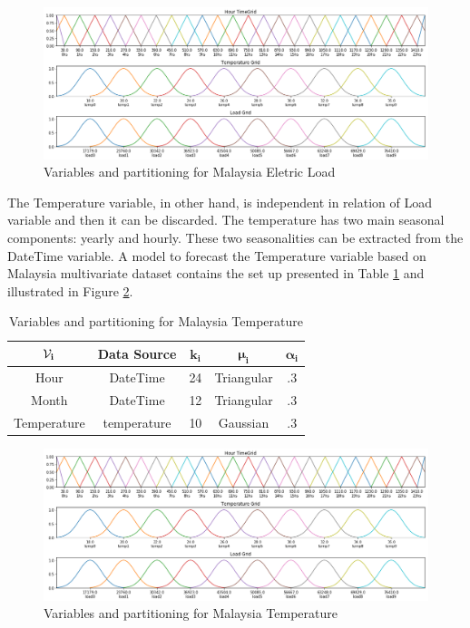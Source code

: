\begin{figure}[htb]
    \centering
    \includegraphics[width=\textwidth]{figures/variables_malaysia.png}
    \caption{Variables and partitioning for Malaysia Eletric Load}
    \label{fig:variables_malaysia_load}
\end{figure}

The Temperature variable, in other hand, is independent in relation of Load variable and then it can be discarded. The temperature has two main seasonal components: yearly and hourly. These two seasonalities can be extracted from the DateTime variable.  A model to forecast the Temperature variable based on Malaysia multivariate dataset contains the set up presented in Table \ref{tab:variables_malaysia_temperature} and illustrated in Figure \ref{fig:variables_malaysia_temperature}.

\begin{table}[htb]
    \centering
    \begin{tabular}{|c|c|c|c|c|} \hline
        $\mathbf{\mathcal{V}_i}$ & \textbf{Data Source} & $\mathbf{k_i}$ & $\mathbf{\mu_i}$ & $\mathbf{\alpha_i}$  \\ \hline
        Hour & DateTime & 24 & Triangular & .3 \\ \hline 
        Month & DateTime & 12 & Triangular & .3 \\ \hline 
        Temperature & temperature & 10 & Gaussian & .3 \\ \hline 
    \end{tabular}
    \caption{Variables and partitioning for Malaysia Temperature}
    \label{tab:variables_malaysia_temperature}
\end{table}

\begin{figure}[htb]
    \centering
    \includegraphics[width=\textwidth]{figures/variables_malaysia.png}
    \caption{Variables and partitioning for Malaysia Temperature}
    \label{fig:variables_malaysia_temperature}
\end{figure}

